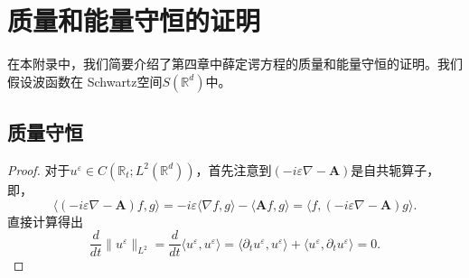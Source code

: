 \chapter{质量和能量守恒的证明}
\label{app_nufft}

在本附录中，我们简要介绍了第四章中薛定谔方程的质量和能量守恒的证明。我们假设波函数在
Schwartz空间$S(\mathbb R^d)$中。

\section{质量守恒}
\begin{proof}
对于$u^{\varepsilon}\in C(\mathbb{R}_t;L^2(\mathbb{R}^d))$，首先注意到$(-i\varepsilon\nabla-\mathbf{A})$是自共轭算子，即，
\begin{equation}
\langle(-i\varepsilon\nabla-\mathbf{A})f,g\rangle=-i\varepsilon\langle\nabla f,g\rangle-\langle\mathbf{A}f,g\rangle
=\langle f,(-i\varepsilon\nabla-\mathbf{A})g\rangle.
\end{equation}
直接计算得出
\begin{equation}\nonumber
\frac{d}{dt}\| u^{\varepsilon}\|_{L^2}=\frac{d}{dt}\langle u^{\varepsilon},u^{\varepsilon}\rangle=\langle\partial_t u^{\varepsilon},u^{\varepsilon}\rangle+\langle u^{\varepsilon},\partial_t u^{\varepsilon}\rangle =0.
\end{equation}
\end{proof}
\vspace{-1.0cm}
